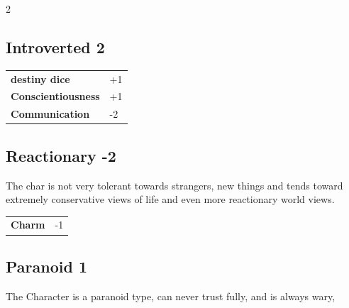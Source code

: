\begin{multicols}{2}
\begin{tcolorbox}
\end{tcolorbox}

\begin{tcolorbox}
    \subsection*{Introverted \hfill \small{2 }}
    \tcblower




\begin{tabular}{@{}ll@{}}
    \textbf{destiny dice} & +1\\
    \textbf{Conscientiousness} & +1\\
    \textbf{Communication} & -2\\
\end{tabular}


\end{tcolorbox}

\begin{tcolorbox}
    \subsection*{Reactionary \hfill \small{-2 }}
    \tcblower
The char is not very tolerant towards strangers, new things and tends toward extremely conservative views of life and even more reactionary world views.


\vspace{3mm}

\begin{tabular}{@{}ll@{}}
    \textbf{Charm} & -1\\
\end{tabular}


\end{tcolorbox}

\begin{tcolorbox}
    \subsection*{Paranoid \hfill \small{1 }}
    \tcblower
The Character is a paranoid type, can never trust fully, and is always wary,



\end{tcolorbox}
\end{multicols}
